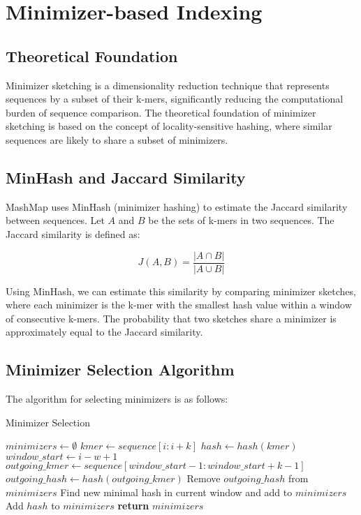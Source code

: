 \documentclass{article}
\begin{document}
\section{Minimizer-based Indexing}

\subsection{Theoretical Foundation}

Minimizer sketching is a dimensionality reduction technique that represents sequences by a subset of their k-mers, significantly reducing the computational burden of sequence comparison. The theoretical foundation of minimizer sketching is based on the concept of locality-sensitive hashing, where similar sequences are likely to share a subset of minimizers.

\subsection{MinHash and Jaccard Similarity}

MashMap uses MinHash (minimizer hashing) to estimate the Jaccard similarity between sequences. Let \(A\) and \(B\) be the sets of k-mers in two sequences. The Jaccard similarity is defined as:

\begin{equation}
J(A, B) = \frac{|A \cap B|}{|A \cup B|}
\end{equation}

Using MinHash, we can estimate this similarity by comparing minimizer sketches, where each minimizer is the k-mer with the smallest hash value within a window of consecutive k-mers. The probability that two sketches share a minimizer is approximately equal to the Jaccard similarity.

\subsection{Minimizer Selection Algorithm}

The algorithm for selecting minimizers is as follows:

\begin{algorithm}
\caption{Minimizer Selection}
\begin{algorithmic}[1]
\State $minimizers \gets \emptyset$
    \State $kmer \gets sequence[i:i+k]$
    \State $hash \gets hash(kmer)$
        \State $window\_start \gets i - w + 1$
        \State $outgoing\_kmer \gets sequence[window\_start-1:window\_start+k-1]$
        \State $outgoing\_hash \gets hash(outgoing\_kmer)$
            \State Remove $outgoing\_hash$ from $minimizers$
            \State Find new minimal hash in current window and add to $minimizers$
        \EndIf
    \EndIf
        \State Add $hash$ to $minimizers$
    \EndIf
\EndFor
\State \textbf{return} $minimizers$
\EndProcedure
\end{algorithmic}
\end{algorithm}
\end{document}
